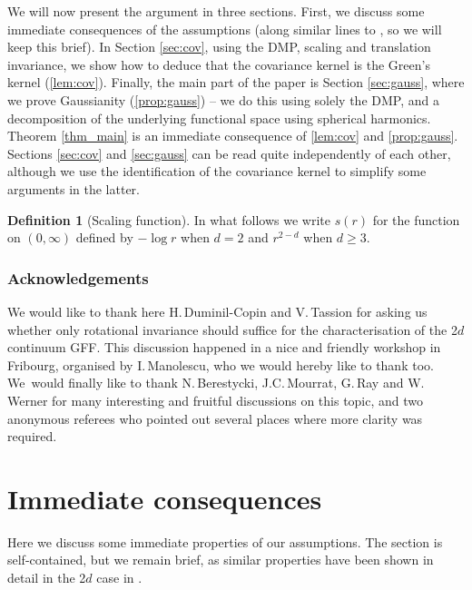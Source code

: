 \documentclass[10pt]{amsart}
\theoremstyle{definition}
\newtheorem{definition}[theorem]{Definition}
\begin{document}
We will now present the argument in three sections. First, we discuss some immediate consequences of the assumptions (along similar lines to \cite{BPR18}, so we will keep this brief). In Section \ref{sec:cov}, using the DMP, scaling and translation invariance, we show how to deduce that the covariance kernel is the Green's kernel (\cref{lem:cov}). Finally, the main part of the paper is Section \ref{sec:gauss}, where we prove Gaussianity (\cref{prop:gauss}) -- we do this using solely the DMP, and a decomposition of the underlying functional space using spherical harmonics. Theorem \ref{thm_main} is an immediate consequence of \cref{lem:cov} and \cref{prop:gauss}. Sections \ref{sec:cov} and \ref{sec:gauss} can be read quite independently of each other, although we use the identification of the covariance kernel to simplify some arguments in the latter.

\begin{definition}[Scaling function]\label{def:s}
In what follows we write $s(r)$ for the function on $(0,\infty)$ defined by $-\log r$ when $d=2$ and $r^{2-d}$ when $d\ge 3$.
\end{definition}

\subsubsection*{Acknowledgements}
We would like to thank here H.\,Duminil-Copin and V.\,Tassion for asking us whether only rotational invariance should suffice for the characterisation of the 2$d$ continuum GFF. This discussion happened in a nice and friendly workshop in Fribourg, organised by I.\,Manolescu, who we would hereby like to thank too. We~would finally like to thank N.\,Berestycki, J.C.\,Mourrat, G.\,Ray and W.\,Werner for many interesting and fruitful discussions on this topic, and two anonymous referees who pointed out several places where more clarity was required.

\section{Immediate consequences}\label{sec:immediate_consequences}

{Here we discuss some immediate properties of our assumptions. The section is self-contained, but we remain brief, as similar properties have been shown in detail in the 2$d$ case in \cite{BPR18}.}
\end{document}
